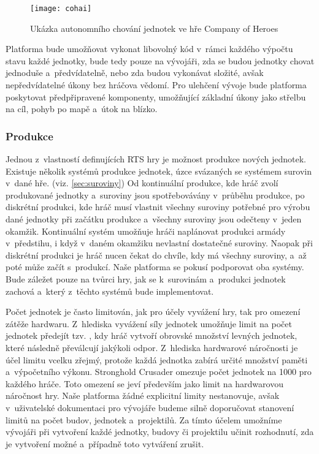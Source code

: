 \begin{figure}[h]	
	\centering
	\texttt{[image: cohai]}
	\caption{Ukázka autonomního chování jednotek ve hře Company of Heroes \citep{site:COH}}
	\label{fig:cohai}
\end{figure}

Platforma bude umožňovat vykonat libovolný kód v~rámci každého výpočtu stavu každé jednotky, bude tedy pouze na vývojáři, zda se budou jednotky chovat jednoduše a~předvídatelně, nebo zda budou vykonávat složité, avšak nepředvídatelné úkony bez hráčova vědomí. Pro ulehčení vývoje bude platforma poskytovat předpřipravené komponenty, umožňující základní úkony jako střelbu na cíl, pohyb po mapě a~útok na blízko.

\subsubsection{Produkce}

Jednou z~vlastností definujících RTS hry je možnost produkce nových jednotek. Existuje několik systémů produkce jednotek, úzce svázaných se systémem surovin v~dané hře. (viz. \ref{sec:suroviny})  Od kontinuální produkce, kde hráč zvolí produkované jednotky a~suroviny jsou spotřebovávány v~průběhu produkce, po diskrétní produkci, kde hráč musí vlastnit všechny suroviny potřebné pro výrobu dané jednotky při začátku produkce a~všechny suroviny jsou odečteny v~jeden okamžik. Kontinuální systém umožňuje hráči naplánovat produkci armády v~předstihu, i když v~daném okamžiku nevlastní dostatečné suroviny. Naopak při diskrétní produkci je hráč nucen čekat do chvíle, kdy má všechny suroviny, a~až poté může začít s~produkcí. Naše platforma se pokusí podporovat oba systémy. Bude záležet pouze na tvůrci hry, jak se k~surovinám a~produkci jednotek zachová a~který z~těchto systémů bude implementovat.

Počet jednotek je často limitován, jak pro účely vyvážení hry, tak pro omezení zátěže hardwaru. Z~hlediska vyvážení síly jednotek umožňuje limit na počet jednotek předejít tzv. , kdy hráč vytvoří obrovské množství levných jednotek, které následně převálcují jakýkoli odpor. Z~hlediska hardwarové náročnosti je účel limitu vcelku zřejmý, protože každá jednotka zabírá určité množství paměti a~výpočetního výkonu. Stronghold Crusader omezuje počet jednotek na 1000 pro každého hráče. Toto omezení se jeví především jako limit na hardwarovou náročnost hry. Naše platforma žádné explicitní limity nestanovuje, avšak v~uživatelské dokumentaci pro vývojáře budeme silně doporučovat stanovení limitů na počet budov, jednotek a~projektilů. Za tímto účelem umožníme vývojáři při vytvoření každé jednotky, budovy či projektilu učinit rozhodnutí, zda je vytvoření možné a~případně toto vytváření zrušit. 

